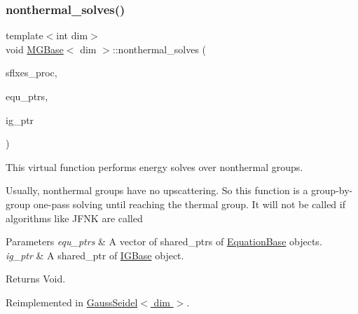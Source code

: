 \subsubsection{\texorpdfstring{nonthermal\+\_\+solves()}{nonthermal\_solves()}}
{\footnotesize\ttfamily template$<$int dim$>$ \\
void \hyperlink{class_m_g_base}{M\+G\+Base}$<$ dim $>$\+::nonthermal\+\_\+solves (\begin{DoxyParamCaption}\item[{std\+::vector$<$ Vector$<$ double $>$ $>$ \&}]{sflxes\+\_\+proc,  }\item[{std\+::vector$<$ std\+\_\+cxx11\+::shared\+\_\+ptr$<$ \hyperlink{class_equation_base}{Equation\+Base}$<$ dim $>$ $>$ $>$ \&}]{equ\+\_\+ptrs,  }\item[{std\+\_\+cxx11\+::shared\+\_\+ptr$<$ \hyperlink{class_i_g_base}{I\+G\+Base}$<$ dim $>$ $>$}]{ig\+\_\+ptr }\end{DoxyParamCaption})\hspace{0.3cm}{\ttfamily [virtual]}}

This virtual function performs energy solves over nonthermal groups.

Usually, nonthermal groups have no upscattering. So this function is a group-\/by-\/ group one-\/pass solving until reaching the thermal group. It will not be called if algorithms like J\+F\+NK are called


\begin{DoxyParams}{Parameters}
{\em equ\+\_\+ptrs} & A vector of shared\+\_\+ptr\textquotesingle{}s of \hyperlink{class_equation_base}{Equation\+Base} objects. \\
\hline
{\em ig\+\_\+ptr} & A shared\+\_\+ptr of \hyperlink{class_i_g_base}{I\+G\+Base} object. \\
\hline
\end{DoxyParams}
\begin{DoxyReturn}{Returns}
Void. 
\end{DoxyReturn}


Reimplemented in \hyperlink{class_gauss_seidel_a28fc4ef9150773f587f90951c704c994}{Gauss\+Seidel$<$ dim $>$}.

\mbox{\label{class_m_g_base_a9d3c6ab6e58f0119badb30feedb2ac4d}} 
